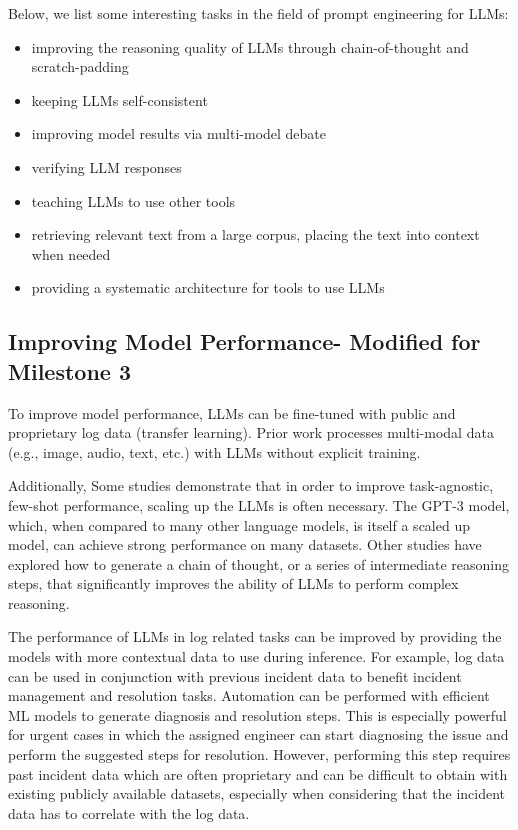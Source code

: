 \documentclass[conference]{IEEEtran}
\begin{document}
Below, we list some interesting tasks in the field of prompt engineering for LLMs:

\begin{itemize}
    \item improving the reasoning quality of LLMs through chain-of-thought and scratch-padding
    \item keeping LLMs self-consistent
    \item improving model results via multi-model debate
    \item verifying LLM responses
    \item teaching LLMs to use other tools
    \item retrieving relevant text from a large corpus, placing the text into context when needed
    \item providing a systematic architecture for tools to use LLMs
\end{itemize}

\subsection{Improving Model Performance- Modified for Milestone 3}

To improve model performance, LLMs can be fine-tuned with public and proprietary log data (transfer learning). Prior work processes multi-modal data (e.g., image, audio, text, etc.) with LLMs without explicit training. \cite{hamadanian2023a} 

Additionally, Some studies demonstrate that in order to improve task-agnostic, few-shot performance, scaling up the LLMs is often necessary. The GPT-3 model, which, when compared to many other language models, is itself a scaled up model, can achieve strong performance on many datasets. \cite{brown2020language} Other studies have explored how to generate a chain of thought, or a series of intermediate reasoning steps, that significantly improves the ability of LLMs to perform complex reasoning. \cite{wei2022chain}

The performance of LLMs in log related tasks can be improved by providing the models with more contextual data to use during inference. For example, log data can be used in conjunction with previous incident data to benefit incident management and resolution tasks. Automation can be performed with efficient ML models to generate diagnosis and resolution steps. This is especially powerful for urgent cases in which the assigned engineer can start diagnosing the issue and perform the suggested steps for resolution. However, performing this step requires past incident data which are often proprietary and can be difficult to obtain with existing publicly available datasets, especially when considering that the incident data has to correlate with the log data. \cite{bendimerad2023onpremise} 
\end{document}
